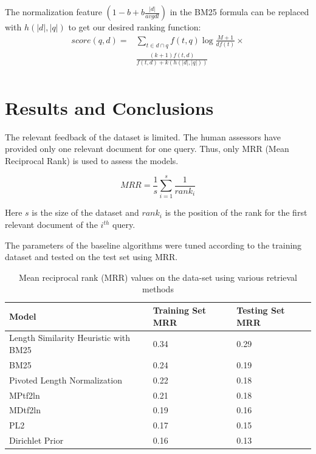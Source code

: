 \documentclass[11pt]{article}
\begin{document}
	The normalization feature $\left( 1 - b + b \frac{|d|}{avgdl} \right)$ in the BM25 formula can be replaced with $h(|d|, |q|)$ to get our desired ranking function:
	\begin{equation}
		\label{heuris}
		\begin{aligned}
			score(q, d) = & \sum_{t \in d \cap q} f(t, q) \log \frac{M + 1}{df(t)} \times \\
			& \frac{ (k + 1) f (t, d) }{f(t, d) + k \left( h(|d|, |q|) \right)}  \\
		\end{aligned}
	\end{equation}
	\section{Results and Conclusions}
	The relevant feedback of the dataset is limited. The human assessors have provided only one relevant document for  one query. Thus, only MRR (Mean Reciprocal Rank) is used to assess the models.
	
	\begin{equation}
		MRR = \frac{1}{s} \sum_{i = 1}^s \frac{1}{rank_i}
	\end{equation}
	
	Here $s$ is the size of the dataset and $rank_i$ is the position of the rank for the first relevant document of the $i^{th}$ query.
	
	The parameters of the baseline algorithms were tuned according to the training dataset and tested on the test set using MRR. 
	
	\begin{table}[H]
		\begin{center}
			\begin{tabular}{ | m{2.56cm} | m{1.5cm}| m{1.5cm} | } 
				\hline
				\textbf{Model} & \textbf{Training Set MRR} & \textbf{Testing Set MRR} \\
				\hline
				Length Similarity Heuristic with BM25  & 0.34  & 0.29  \\
				\hline
				BM25  & 0.24  & 0.19  \\
				\hline
				Pivoted Length Normalization & 0.22  & 0.18  \\
				\hline
				MPtf2ln & 0.21  & 0.18  \\
				\hline
				MDtf2ln  & 0.19  & 0.16  \\
				\hline
				PL2 & 0.17  & 0.15  \\
				\hline
				Dirichlet Prior & 0.16  & 0.13  \\
				\hline
			\end{tabular}
			\caption{Mean reciprocal rank (MRR) values on the data-set using various retrieval methods}
			\label{results}
		\end{center}
	\end{table}
	
\end{document}
